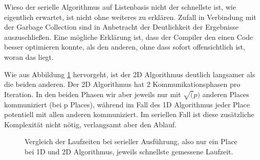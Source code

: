 Wieso der serielle Algorithmus auf Listenbasis nicht der schnellste ist, wie eigentlich erwartet, ist nicht ohne weiteres zu erklären. Zufall in Verbindung mit der Garbage Collection sind in Anbetracht der Deutlichkeit der Ergebnisse auszuschließen. Eine mögliche Erklärung ist, dass der Compiler den einen Code besser optimieren konnte, als den anderen, ohne dass sofort offensichtlich ist, woran das liegt.

Wie aus Abbildung \ref{Vergleich_Seriell} hervorgeht, ist der 2D Algorithmus deutlich langsamer als die beiden anderen. Der 2D Algorithmus hat 2 Kommunikationsphasen pro Iteration. In den beiden Phasen wir aber jeweils nur mit $\sqrt(p)$ anderen Places kommuniziert (bei p Places)\cite{Buluc:2011}, während im Fall des 1D Algorithmus jeder Place potentiell mit allen anderen kommuniziert. Im seriellen Fall ist diese zusätzliche Komplexität nicht nötig, verlangsamt aber den Ablauf.

\begin{figure}
	\centering
	\label{Vergleich_Seriell}
	\caption{Vergleich der Laufzeiten bei serieller Ausführung, also nur ein Place bei 1D und 2D Algorithmus, jeweils schnellste gemessene Laufzeit.}
\end{figure}

